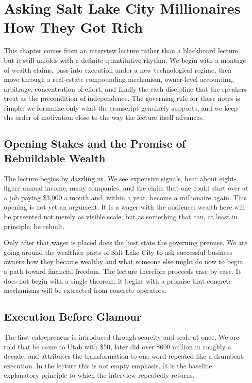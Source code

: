 \chapter{Asking Salt Lake City Millionaires How They Got Rich}

This chapter comes from an interview lecture rather than a blackboard lecture, but it still unfolds with a definite quantitative rhythm. We begin with a montage of wealth claims, pass into execution under a new technological regime, then move through a real-estate compounding mechanism, owner-level accounting, arbitrage, concentration of effort, and finally the cash discipline that the speakers treat as the precondition of independence. The governing rule for these notes is simple: we formalize only what the transcript genuinely supports, and we keep the order of motivation close to the way the lecture itself advances.

\section{Opening Stakes and the Promise of Rebuildable Wealth}

The lecture begins by dazzling us. We see expensive signals, hear about eight-figure annual income, many companies, and the claim that one could start over at a job paying \$3{,}000 a month and, within a year, become a millionaire again. This opening is not yet an argument. It is a wager with the audience: wealth here will be presented not merely as visible scale, but as something that can, at least in principle, be rebuilt.

Only after that wager is placed does the host state the governing premise. We are going around the wealthier parts of Salt Lake City to ask successful business owners how they became wealthy and what someone else might do now to begin a path toward financial freedom. The lecture therefore proceeds case by case. It does not begin with a single theorem; it begins with a promise that concrete mechanisms will be extracted from concrete operators.

\section{Execution Before Glamour}

The first entrepreneur is introduced through scarcity and scale at once. We are told that he came to Utah with \$50, later did over \$600 million in roughly a decade, and attributes the transformation to one word repeated like a drumbeat: execution. In the lecture this is not empty emphasis. It is the baseline explanatory principle to which the interview repeatedly returns.

